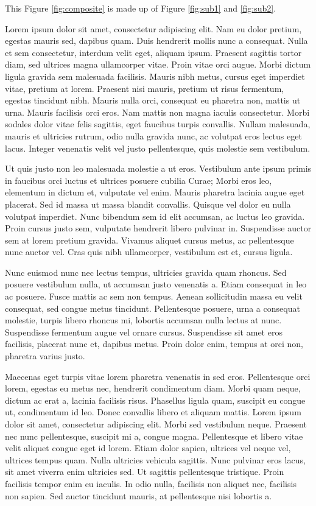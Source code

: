 \documentclass[manuscript]{geophysics}
\begin{document}
This Figure \ref{fig:composite} is made up of Figure \ref{fig:sub1} and
\ref{fig:sub2}.


Lorem ipsum dolor sit amet, consectetur adipiscing elit. Nam eu dolor pretium,
egestas mauris sed, dapibus quam. Duis hendrerit mollis nunc a consequat. Nulla
et sem consectetur, interdum velit eget, aliquam ipsum. Praesent sagittis
tortor diam, sed ultrices magna ullamcorper vitae. Proin vitae orci augue.
Morbi dictum ligula gravida sem malesuada facilisis. Mauris nibh metus, cursus
eget imperdiet vitae, pretium at lorem. Praesent nisi mauris, pretium ut risus
fermentum, egestas tincidunt nibh. Mauris nulla orci, consequat eu pharetra
non, mattis ut urna. Mauris facilisis orci eros. Nam mattis non magna iaculis
consectetur. Morbi sodales dolor vitae felis sagittis, eget faucibus turpis
convallis. Nullam malesuada, mauris et ultricies rutrum, odio nulla gravida
nunc, ac volutpat eros lectus eget lacus. Integer venenatis velit vel justo
pellentesque, quis molestie sem vestibulum.

Ut quis justo non leo malesuada molestie a ut eros. Vestibulum ante ipsum
primis in faucibus orci luctus et ultrices posuere cubilia Curae; Morbi eros
leo, elementum in dictum et, vulputate vel enim. Mauris pharetra lacinia augue
eget placerat. Sed id massa ut massa blandit convallis. Quisque vel dolor eu
nulla volutpat imperdiet. Nunc bibendum sem id elit accumsan, ac luctus leo
gravida. Proin cursus justo sem, vulputate hendrerit libero pulvinar in.
Suspendisse auctor sem at lorem pretium gravida. Vivamus aliquet cursus metus,
ac pellentesque nunc auctor vel. Cras quis nibh ullamcorper, vestibulum est et,
cursus ligula.

Nunc euismod nunc nec lectus tempus, ultricies gravida quam rhoncus. Sed
posuere vestibulum nulla, ut accumsan justo venenatis a. Etiam consequat in leo
ac posuere. Fusce mattis ac sem non tempus. Aenean sollicitudin massa eu velit
consequat, sed congue metus tincidunt. Pellentesque posuere, urna a consequat
molestie, turpis libero rhoncus mi, lobortis accumsan nulla lectus at nunc.
Suspendisse fermentum augue vel ornare cursus. Suspendisse sit amet eros
facilisis, placerat nunc et, dapibus metus. Proin dolor enim, tempus at orci
non, pharetra varius justo.

Maecenas eget turpis vitae lorem pharetra venenatis in sed eros. Pellentesque
orci lorem, egestas eu metus nec, hendrerit condimentum diam. Morbi quam neque,
dictum ac erat a, lacinia facilisis risus. Phasellus ligula quam, suscipit eu
congue ut, condimentum id leo. Donec convallis libero et aliquam mattis. Lorem
ipsum dolor sit amet, consectetur adipiscing elit. Morbi sed vestibulum neque.
Praesent nec nunc pellentesque, suscipit mi a, congue magna. Pellentesque et
libero vitae velit aliquet congue eget id lorem. Etiam dolor sapien, ultrices
vel neque vel, ultrices tempus quam. Nulla ultricies vehicula sagittis. Nunc
pulvinar eros lacus, sit amet viverra enim ultricies sed. Ut sagittis
pellentesque tristique. Proin facilisis tempor enim eu iaculis. In odio nulla,
facilisis non aliquet nec, facilisis non sapien. Sed auctor tincidunt mauris,
at pellentesque nisi lobortis a.
\end{document}
